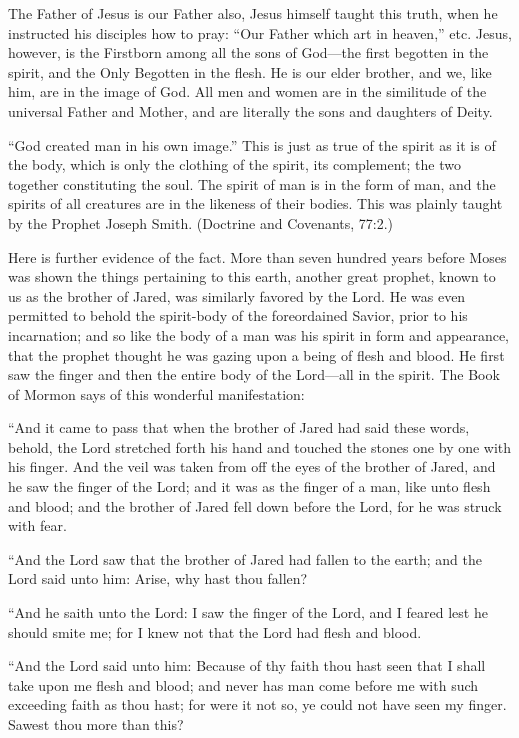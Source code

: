 The Father of Jesus is our Father also, Jesus himself taught this truth, when he instructed his
disciples how to pray: ``Our Father which art in heaven,'' etc. Jesus, however, is the Firstborn
among all the sons of God—the first begotten in the spirit, and the Only Begotten in the
flesh. He is our elder brother, and we, like him, are in the image of God. All men and women
are in the similitude of the universal Father and Mother, and are literally the sons and
daughters of Deity.

``God created man in his own image.'' This is just as true of the spirit as it is of the body,
which is only the clothing of the spirit, its complement; the two together constituting the
soul. The spirit of man is in the form of man, and the spirits of all creatures are in the likeness
of their bodies. This was plainly taught by the Prophet Joseph Smith. (Doctrine and
Covenants, 77:2.)

Here is further evidence of the fact. More than seven hundred years before Moses was shown
the things pertaining to this earth, another great prophet, known to us as the brother of Jared,
was similarly favored by the Lord. He was even permitted to behold the spirit-body of the
foreordained Savior, prior to his incarnation; and so like the body of a man was his spirit in
form and appearance, that the prophet thought he was gazing upon a being of flesh and
blood. He first saw the finger and then the entire body of the Lord—all in the spirit. The
Book of Mormon says of this wonderful manifestation:

``And it came to pass that when the brother of Jared had said these words, behold, the Lord
stretched forth his hand and touched the stones one by one with his finger. And the veil was
taken from off the eyes of the brother of Jared, and he saw the finger of the Lord; and it was
as the finger of a man, like unto flesh and blood; and the brother of Jared fell down before the
Lord, for he was struck with fear.

``And the Lord saw that the brother of Jared had fallen to the earth; and the Lord said unto
him: Arise, why hast thou fallen?

``And he saith unto the Lord: I saw the finger of the Lord, and I feared lest he should smite
me; for I knew not that the Lord had flesh and blood.

``And the Lord said unto him: Because of thy faith thou hast seen that I shall take upon me
flesh and blood; and never has man come before me with such exceeding faith as thou hast;
for were it not so, ye could not have seen my finger. Sawest thou more than this?

